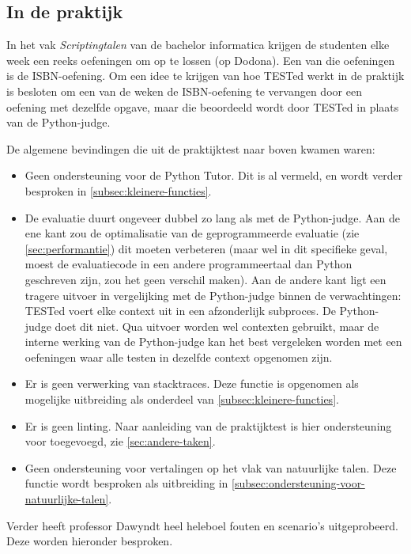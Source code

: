 \subsection{In de praktijk}\label{subsec:in-de-praktijk}

In het vak \emph{Scriptingtalen} van de bachelor informatica krijgen de studenten elke week een reeks oefeningen om op te lossen (op Dodona).
Een van die oefeningen is de ISBN-oefening.
Om een idee te krijgen van hoe TESTed werkt in de praktijk is besloten om een van de weken de ISBN-oefening te vervangen door een oefening met dezelfde opgave, maar die beoordeeld wordt door TESTed in plaats van de Python-judge.

De algemene bevindingen die uit de praktijktest naar boven kwamen waren:

\begin{itemize}
    \item Geen ondersteuning voor de Python Tutor.
    Dit is al vermeld, en wordt verder besproken in \cref{subsec:kleinere-functies}.
    \item De evaluatie duurt ongeveer dubbel zo lang als met de Python-judge.
    Aan de ene kant zou de optimalisatie van de geprogrammeerde evaluatie (zie \cref{sec:performantie}) dit moeten verbeteren (maar wel in dit specifieke geval, moest de evaluatiecode in een andere programmeertaal dan Python geschreven zijn, zou het geen verschil maken).
    Aan de andere kant ligt een tragere uitvoer in vergelijking met de Python-judge binnen de verwachtingen: TESTed voert elke context uit in een afzonderlijk subproces.
    De Python-judge doet dit niet.
    Qua uitvoer worden wel contexten gebruikt, maar de interne werking van de Python-judge kan het best vergeleken worden met een oefeningen waar alle testen in dezelfde context opgenomen zijn.
    \item Er is geen verwerking van stacktraces.
    Deze functie is opgenomen als mogelijke uitbreiding als onderdeel van \cref{subsec:kleinere-functies}.
    \item Er is geen linting.
    Naar aanleiding van de praktijktest is hier ondersteuning voor toegevoegd, zie \cref{sec:andere-taken}.
    \item Geen ondersteuning voor vertalingen op het vlak van natuurlijke talen.
    Deze functie wordt besproken als uitbreiding in \cref{subsec:ondersteuning-voor-natuurlijke-talen}.
\end{itemize}

Verder heeft professor Dawyndt heel heleboel fouten en scenario's uitgeprobeerd.
Deze worden hieronder besproken.

